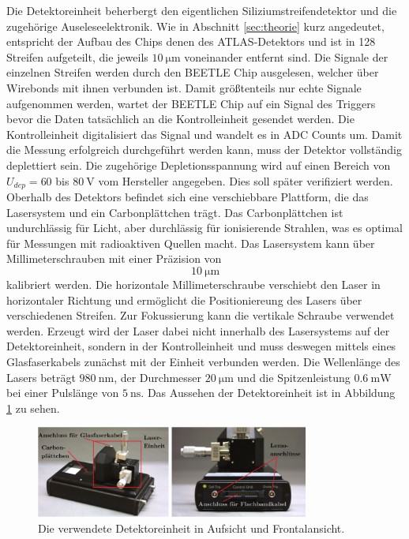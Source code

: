 Die Detektoreinheit beherbergt den eigentlichen Siliziumstreifendetektor und die zugehörige Auseleseelektronik.
Wie in Abschnitt \ref{sec:theorie} kurz angedeutet, entspricht der Aufbau des Chips denen des ATLAS-Detektors und ist in 128 Streifen aufgeteilt, die jeweils $\SI{10}{\micro\metre}$ voneinander entfernt sind.
Die Signale der einzelnen Streifen werden durch den BEETLE Chip ausgelesen, welcher über Wirebonds mit ihnen verbunden ist.
Damit größtenteils nur echte Signale aufgenommen werden, wartet der BEETLE Chip auf ein Signal des Triggers bevor die Daten tatsächlich an die Kontrolleinheit gesendet werden.
Die Kontrolleinheit digitalisiert das Signal und wandelt es in ADC Counts um.
Damit die Messung erfolgreich durchgeführt werden kann, muss der Detektor vollständig deplettiert sein.
Die zugehörige Depletionsspannung wird auf einen Bereich von $U_{dep} = 60$ bis $\SI{80}{\volt}$ vom Hersteller angegeben.
Dies soll später verifiziert werden.
Oberhalb des Detektors befindet sich eine verschiebbare Plattform, die das Lasersystem und ein Carbonplättchen trägt.
Das Carbonplättchen ist undurchlässig für Licht, aber durchlässig für ionisierende Strahlen, was es optimal für Messungen mit radioaktiven Quellen macht.
Das Lasersystem kann über Millimeterschrauben mit einer Präzision von $$\SI{10}{\micro\metre}$$ kalibriert werden.
Die horizontale Millimeterschraube verschiebt den Laser in horizontaler Richtung und ermöglicht die Positioniereung des Lasers über verschiedenen Streifen.
Zur Fokussierung kann die vertikale Schraube verwendet werden.
Erzeugt wird der Laser dabei nicht innerhalb des Lasersystems auf der Detektoreinheit, sondern in der Kontrolleinheit und muss deswegen mittels eines Glasfaserkabels zunächst mit der Einheit verbunden werden.
Die Wellenlänge des Lasers beträgt $\SI{980}{\nano\metre}$, der Durchmesser $\SI{20}{\micro\metre}$ und die Spitzenleistung $\SI{0.6}{\milli\watt}$ bei einer Pulslänge von $\SI{5}{\nano\second}$.
Das Aussehen der Detektoreinheit ist in Abbildung \ref{fig:detektoreinheit} zu sehen.

\begin{figure}[H]
  \centering
  \includegraphics[width=0.8\textwidth]{content/graphics/detektoreinheit.png}
  \caption{Die verwendete Detektoreinheit in Aufsicht und Frontalansicht.}
  \label{fig:detektoreinheit}
\end{figure}

